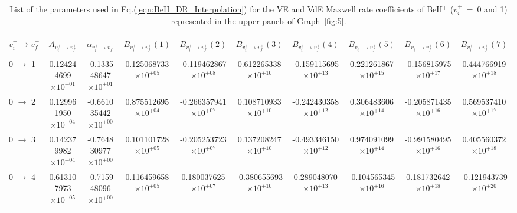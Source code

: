 \documentclass[reviewcopy]{elsarticle}
\begin{document}
\begin{landscape}
\renewcommand{\thefootnote}{\fnsymbol{footnote}}
\renewcommand{\arraystretch}{0.81}
\scriptsize
\setlength\tabcolsep{1.2ex}
\begin{longtable}{lccccccccc}
\caption[table2]{List of the parameters used in Eq.(\ref{eqn:BeH_DR_Interpolation}) for the VE and VdE Maxwell rate coefficients of BeH$^+$  ($v^+_i$~=~0 and 1) represented in the upper panels of Graph~\ref{fig:5}.}\label{tab:BeH_VE_Interpolation0-1}\vspace{0.5cm}\\
\hline \\[-2ex]
   \multicolumn{1}{c}{$v^+_i \to v^+_f$} &
   \multicolumn{1}{c}{$A_{{v^+_i}\to {v^+_f}}$} &
   \multicolumn{1}{c}{$\alpha_{{v^+_i}\to {v^+_f}}$} &
   \multicolumn{1}{c}{$B_{{v^+_i}\to {v^+_f}}(1)$} &
   \multicolumn{1}{c}{$B_{{v^+_i}\to {v^+_f}}(2)$} &
   \multicolumn{1}{c}{$B_{{v^+_i}\to {v^+_f}}(3)$} &
   \multicolumn{1}{c}{$B_{{v^+_i}\to {v^+_f}}(4)$}  &
   \multicolumn{1}{c}{$B_{{v^+_i}\to {v^+_f}}(5)$} &
   \multicolumn{1}{c}{$B_{{v^+_i}\to {v^+_f}}(6)$} &
   \multicolumn{1}{c}{$B_{{v^+_i}\to {v^+_f}}(7)$} \\[5pt]
 \hline \\[-2ex]
\endhead
0 $\to$ 1  & 0.124244699$\times10^{-01}$  & -0.133548647$\times10^{+01}$  & 0.125068733$\times10^{+05}$  & -0.119462867$\times10^{+08}$  & 0.612265338$\times10^{+10}$  & -0.159115695$\times10^{+13}$  & 0.221261867$\times10^{+15}$  & -0.156815975$\times10^{+17}$  & 0.444766919$\times10^{+18}$ \\
 0 $\to$ 2  & 0.129961950$\times10^{-04}$  & -0.661035442$\times10^{+00}$  & 0.875512695$\times10^{+04}$  & -0.266357941$\times10^{+07}$  & 0.108710933$\times10^{+10}$  & -0.242430358$\times10^{+12}$  & 0.306483606$\times10^{+14}$  & -0.205871435$\times10^{+16}$  & 0.569537410$\times10^{+17}$ \\
 0 $\to$ 3  & 0.142379982$\times10^{-04}$  & -0.764830977$\times10^{+00}$  & 0.101101728$\times10^{+05}$  & -0.205253723$\times10^{+07}$  & 0.137208247$\times10^{+10}$  & -0.493346150$\times10^{+12}$  & 0.974091099$\times10^{+14}$  & -0.991580495$\times10^{+16}$  & 0.405560372$\times10^{+18}$ \\
 0 $\to$ 4  & 0.613107973$\times10^{-05}$  & -0.715948096$\times10^{+00}$  & 0.116459658$\times10^{+05}$  & 0.180037625$\times10^{+07}$  & -0.380655693$\times10^{+10}$  & 0.289048070$\times10^{+13}$  & -0.104565345$\times10^{+16}$  & 0.181732642$\times10^{+18}$  & -0.121943739$\times10^{+20}$ \\

\end{longtable}
\end{landscape}
\end{document}
